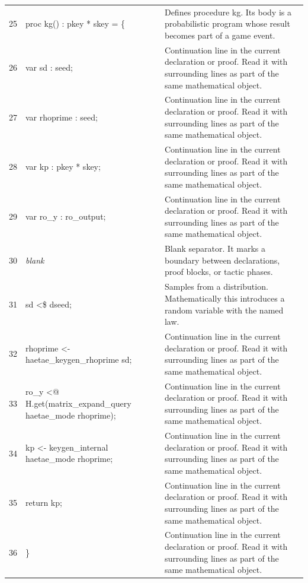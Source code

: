 \documentclass[10pt]{article}
\begin{document}
\begin{longtable}{r L{0.53\textwidth} L{0.37\textwidth}}
25 & {\ttfamily\scriptsize   proc kg() : pkey * skey = \{} & Defines procedure kg.  Its body is a probabilistic program whose result becomes part of a game event. \\
26 & {\ttfamily\scriptsize     var sd : seed;} & Continuation line in the current declaration or proof.  Read it with surrounding lines as part of the same mathematical object. \\
27 & {\ttfamily\scriptsize     var rhoprime : seed;} & Continuation line in the current declaration or proof.  Read it with surrounding lines as part of the same mathematical object. \\
28 & {\ttfamily\scriptsize     var kp : pkey * skey;} & Continuation line in the current declaration or proof.  Read it with surrounding lines as part of the same mathematical object. \\
29 & {\ttfamily\scriptsize     var ro\_y : ro\_output;} & Continuation line in the current declaration or proof.  Read it with surrounding lines as part of the same mathematical object. \\
30 & {\ttfamily\scriptsize \emph{blank}} & Blank separator.  It marks a boundary between declarations, proof blocks, or tactic phases. \\
31 & {\ttfamily\scriptsize     sd <\$ dseed;} & Samples from a distribution.  Mathematically this introduces a random variable with the named law. \\
32 & {\ttfamily\scriptsize     rhoprime <- haetae\_keygen\_rhoprime sd;} & Continuation line in the current declaration or proof.  Read it with surrounding lines as part of the same mathematical object. \\
33 & {\ttfamily\scriptsize     ro\_y <@ H.get(matrix\_expand\_query haetae\_mode rhoprime);} & Continuation line in the current declaration or proof.  Read it with surrounding lines as part of the same mathematical object. \\
34 & {\ttfamily\scriptsize     kp <- keygen\_internal haetae\_mode rhoprime;} & Continuation line in the current declaration or proof.  Read it with surrounding lines as part of the same mathematical object. \\
35 & {\ttfamily\scriptsize     return kp;} & Continuation line in the current declaration or proof.  Read it with surrounding lines as part of the same mathematical object. \\
36 & {\ttfamily\scriptsize   \}} & Continuation line in the current declaration or proof.  Read it with surrounding lines as part of the same mathematical object. \\

\end{longtable}
\end{document}
